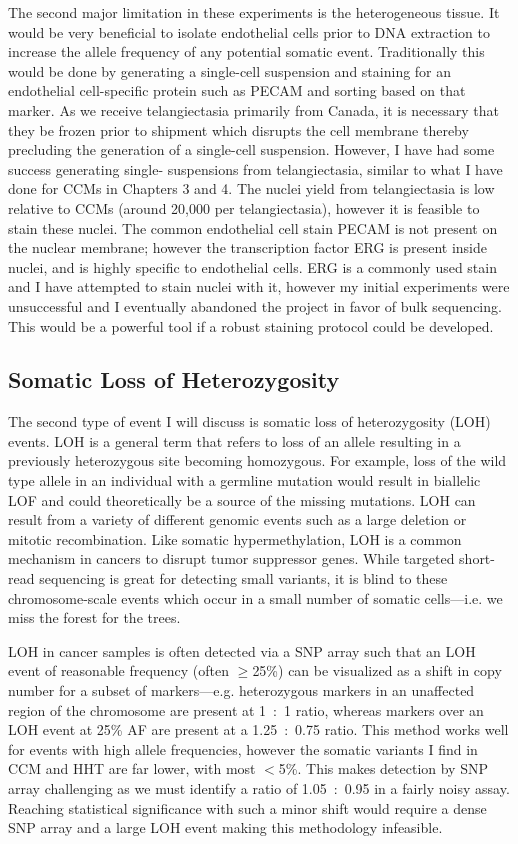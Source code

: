 The second major limitation in these experiments is the heterogeneous tissue. It would be very beneficial to isolate endothelial cells prior to DNA extraction to increase the allele frequency of any potential somatic event. Traditionally this would be done by generating a single-cell suspension and staining for an endothelial cell-specific protein such as PECAM and sorting based on that marker. As we receive telangiectasia primarily from Canada, it is necessary that they be frozen prior to shipment which disrupts the cell membrane thereby precluding the generation of a single-cell suspension. However, I have had some success generating single- suspensions from telangiectasia, similar to what I have done for CCMs in Chapters 3 and 4. The nuclei yield from telangiectasia is low relative to CCMs (around 20,000 per telangiectasia), however it is feasible to stain these nuclei. The common endothelial cell stain PECAM is not present on the nuclear membrane; however the transcription factor ERG is present inside nuclei, and is highly specific to endothelial cells. ERG is a commonly used stain and I have attempted to stain nuclei with it, however my initial experiments were unsuccessful and I eventually abandoned the project in favor of bulk sequencing. This would be a powerful tool if a robust staining protocol could be developed. 

\subsection{Somatic Loss of Heterozygosity}
The second type of event I will discuss is somatic loss of heterozygosity (LOH) events. LOH is a general term that refers to loss of an allele resulting in a previously heterozygous site becoming homozygous. For example, loss of the wild type  allele in an individual with a germline  mutation would result in biallelic LOF and could theoretically be a source of the missing mutations. LOH can result from a variety of different genomic events such as a large deletion or mitotic recombination. Like somatic hypermethylation, LOH is a common mechanism in cancers to disrupt tumor suppressor genes. While targeted short-read sequencing is great for detecting small variants, it is blind to these chromosome-scale events which occur in a small number of somatic cells---i.e. we miss the forest for the trees. 

LOH in cancer samples is often detected via a SNP array such that an LOH event of reasonable frequency (often $\geq$25\%) can be visualized as a shift in copy number for a subset of markers---e.g. heterozygous markers in an unaffected region of the chromosome are present at 1~:~1 ratio, whereas markers over an LOH event at 25\% AF are present at a 1.25~:~0.75 ratio. This method works well for events with high allele frequencies, however the somatic variants I find in CCM and HHT are far lower, with most $<$5\%. This makes detection by SNP array challenging as we must identify a ratio of 1.05~:~0.95 in a fairly noisy assay. Reaching statistical significance with such a minor shift would require a dense SNP array and a large LOH event making this methodology infeasible. 

